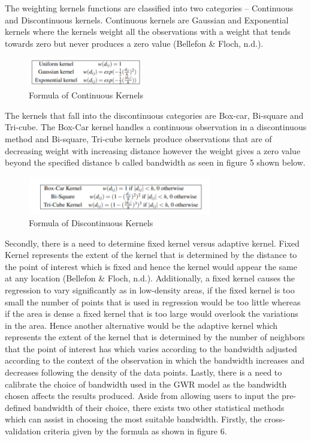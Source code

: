 \documentclass{acm_proc_article-sp}
\begin{document}
The weighting kernels functions are classified into two categories --
Continuous and Discontinuous kernels. Continuous kernels are Gaussian
and Exponential kernels where the kernels weight all the observations
with a weight that tends towards zero but never produces a zero value
(Bellefon \& Floch, n.d.).\\

\begin{figure}[h]
\centering
\includegraphics[width=5cm]{continuous.png}
\caption{Formula of Continuous Kernels}\label{fig4}
\end{figure}

The kernels that fall into the discontinuous categories are Box-car,
Bi-square and Tri-cube. The Box-Car kernel handles a continuous
observation in a discontinuous method and Bi-square, Tri-cube kernels
produce observations that are of decreasing weight with increasing
distance however the weight gives a zero value beyond the specified
distance b called bandwidth as seen in figure 5 shown below.\\

\begin{figure}[h]
\centering
\includegraphics[width=8cm]{discontinuous.png}
\caption{Formula of Discontinuous Kernels}\label{fig5}
\end{figure}

Secondly, there is a need to determine fixed kernel versus adaptive
kernel. Fixed Kernel represents the extent of the kernel that is
determined by the distance to the point of interest which is fixed and
hence the kernel would appear the same at any location (Bellefon \&
Floch, n.d.). Additionally, a fixed kernel causes the regression to vary
significantly as in low-density areas, if the fixed kernel is too small
the number of points that is used in regression would be too little
whereas if the area is dense a fixed kernel that is too large would
overlook the variations in the area. Hence another alternative would be
the adaptive kernel which represents the extent of the kernel that is
determined by the number of neighbors that the point of interest has
which varies according to the bandwidth adjusted according to the
context of the observation in which the bandwidth increases and
decreases following the density of the data points. Lastly, there is a
need to calibrate the choice of bandwidth used in the GWR model as the
bandwidth chosen affects the results produced. Aside from allowing users
to input the pre-defined bandwidth of their choice, there exists two
other statistical methods which can assist in choosing the most suitable
bandwidth. Firstly, the cross-validation criteria given by the formula
as shown in figure 6.\\
\end{document}
